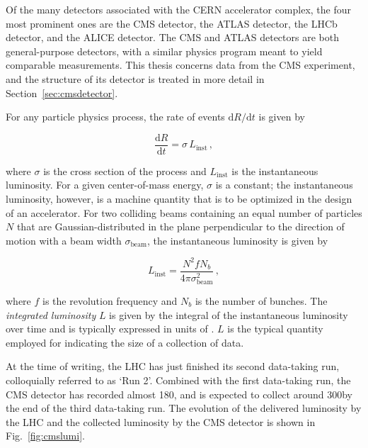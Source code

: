 Of the many detectors associated with the CERN accelerator complex, the four most prominent ones are the CMS detector, the ATLAS detector, the LHCb detector, and the ALICE detector.
% 
The CMS and ATLAS detectors are both general-purpose detectors, with a similar physics program meant to yield comparable measurements.
% 
This thesis concerns data from the CMS experiment, and the structure of its detector is treated in more detail in Section~\ref{sec:cmsdetector}.


For any particle physics process, the rate of events $\mathrm{d}R/\mathrm{d}t$ is given by
% 
\begin{linenomath*}
\begin{equation}
\frac{\mathrm{d}R}{\mathrm{d}t} = \sigma \, L_\text{inst}
\,,
\end{equation}
\end{linenomath*}
% 
where $\sigma$ is the cross section of the process and $L_\text{inst}$ is the instantaneous luminosity.
% 
For a given center-of-mass energy, $\sigma$ is a constant; the instantaneous luminosity, however, is a machine quantity that is to be optimized in the design of an accelerator.
% 
For two colliding beams containing an equal number of particles $N$ that are Gaussian-distributed in the plane perpendicular to the direction of motion with a beam width $\sigma_\text{beam}$, the instantaneous luminosity is given by~\cite{griffiths}
% 
\begin{linenomath*}
\begin{equation}
L_\text{inst} =
\frac{
    N^2 f N_b 
    }{
    4 \pi \sigma_\text{beam}^2
    }
\,,
\end{equation}
\end{linenomath*}
% 
where $f$ is the revolution frequency and $N_b$ is the number of bunches.
% 
The \textit{integrated luminosity} $L$ is given by the integral of the instantaneous luminosity over time and is typically expressed in units of \fbinv.
% 
$L$ is the typical quantity employed for indicating the size of a collection of data.


At the time of writing, the LHC has just finished its second data-taking run, colloquially referred to as `Run 2'.
% 
Combined with the first data-taking run, the CMS detector has recorded almost 180\fbinv, and is expected to collect around 300\fbinv by the end of the third data-taking run.
% 
The evolution of the delivered luminosity by the LHC and the collected luminosity by the CMS detector is shown in Fig.~\ref{fig:cmslumi}.

